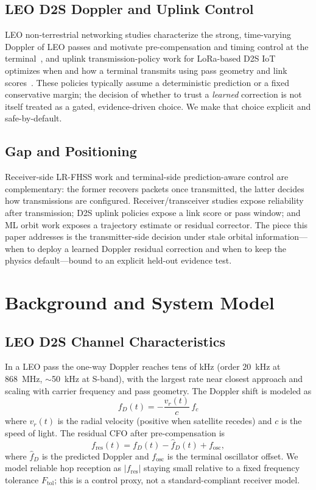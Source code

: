 \documentclass[conference]{IEEEtran}
\begin{document}
\subsection{LEO D2S Doppler and Uplink Control}
LEO non-terrestrial networking studies characterize the strong, time-varying
Doppler of LEO passes and motivate pre-compensation and timing control at the
terminal~\cite{3gpp2019tr38821,hurn2023lrfhss}, and uplink transmission-policy
work for LoRa-based D2S IoT optimizes when and how a terminal transmits using
pass geometry and link scores~\cite{alvarez2022uplink}. These policies typically
assume a deterministic prediction or a fixed conservative margin; the decision of
whether to trust a \emph{learned} correction is not itself treated as a gated,
evidence-driven choice. We make that choice explicit and safe-by-default.

\subsection{Gap and Positioning}
Receiver-side LR-FHSS work and terminal-side prediction-aware control are
complementary: the former recovers packets once transmitted, the latter decides
how transmissions are configured. Receiver/transceiver studies expose reliability
after transmission; D2S uplink policies expose a link score or pass window; and ML
orbit work exposes a trajectory estimate or residual corrector. The piece this
paper addresses is the transmitter-side decision under stale orbital
information---when to deploy a learned Doppler residual correction and when to keep
the physics default---bound to an explicit held-out evidence test.

\section{Background and System Model}
\label{sec:system}

\subsection{LEO D2S Channel Characteristics}
In a LEO pass the one-way Doppler reaches tens of kHz (order $20$~kHz at 868~MHz,
$\sim$50~kHz at S-band), with the largest rate near closest approach and scaling
with carrier frequency and pass geometry. The Doppler shift is modeled as
\begin{equation}
f_D(t) = -\frac{v_r(t)}{c}\,f_c
\label{eq:doppler}
\end{equation}
where $v_r(t)$ is the radial velocity (positive when satellite recedes) and $c$
is the speed of light. The residual CFO after pre-compensation is
\begin{equation}
f_{\mathrm{res}}(t) = f_D(t) - \hat{f}_D(t) + f_{\mathrm{osc}},
\label{eq:residual_cfo}
\end{equation}
where $\hat{f}_D$ is the predicted Doppler and $f_{\mathrm{osc}}$ is the terminal
oscillator offset. We model reliable hop reception as $|f_{\mathrm{res}}|$ staying
small relative to a fixed frequency tolerance $F_{\mathrm{tol}}$; this is a control
proxy, not a standard-compliant receiver model.
\end{document}
